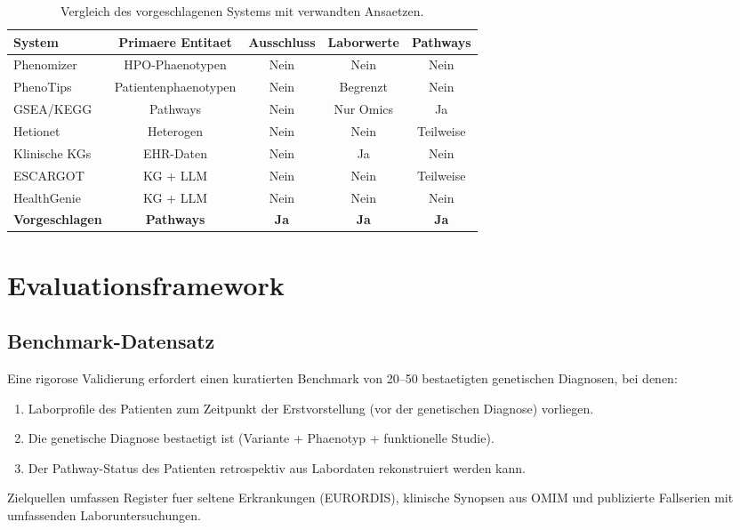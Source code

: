 \documentclass[12pt,a4paper]{article}
\begin{document}
\begin{table}[H]
\centering
\caption{Vergleich des vorgeschlagenen Systems mit verwandten Ansaetzen.}
\label{tab:comparison}
\begin{tabular}{lcccc}
\toprule
\textbf{System} & \textbf{Primaere Entitaet} & \textbf{Ausschluss} & \textbf{Laborwerte} & \textbf{Pathways} \\
\midrule
Phenomizer & HPO-Phaenotypen & Nein & Nein & Nein \\
PhenoTips & Patientenphaenotypen & Nein & Begrenzt & Nein \\
GSEA/KEGG & Pathways & Nein & Nur Omics & Ja \\
Hetionet & Heterogen & Nein & Nein & Teilweise \\
Klinische KGs & EHR-Daten & Nein & Ja & Nein \\
ESCARGOT & KG + LLM & Nein & Nein & Teilweise \\
HealthGenie & KG + LLM & Nein & Nein & Nein \\
\textbf{Vorgeschlagen} & \textbf{Pathways} & \textbf{Ja} & \textbf{Ja} & \textbf{Ja} \\
\bottomrule
\end{tabular}
\end{table}

\section{Evaluationsframework}
\label{sec:evaluation}

\subsection{Benchmark-Datensatz}

Eine rigorose Validierung erfordert einen kuratierten Benchmark von 20--50 bestaetigten genetischen Diagnosen, bei denen:
\begin{enumerate}
    \item Laborprofile des Patienten zum Zeitpunkt der Erstvorstellung (vor der genetischen Diagnose) vorliegen.
    \item Die genetische Diagnose bestaetigt ist (Variante + Phaenotyp + funktionelle Studie).
    \item Der Pathway-Status des Patienten retrospektiv aus Labordaten rekonstruiert werden kann.
\end{enumerate}

Zielquellen umfassen Register fuer seltene Erkrankungen (EURORDIS), klinische Synopsen aus OMIM und publizierte Fallserien mit umfassenden Laboruntersuchungen.
\end{document}
